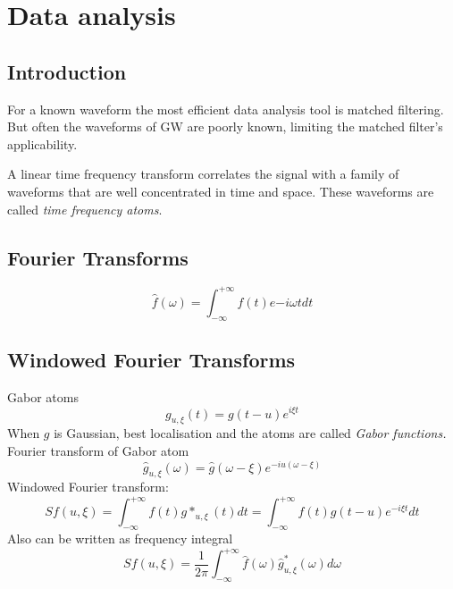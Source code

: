 %

\chapter{Data analysis}           
\section{Introduction}     
For a known waveform the most efficient data analysis tool is matched filtering. But often the waveforms of GW are poorly known, limiting the matched filter's applicability. 

A linear time frequency transform correlates the signal with a family of waveforms that are well concentrated in time and space. These waveforms are called \textit{time frequency atoms}.

\section{Fourier Transforms}
\[\hat{f}(\omega)=\int^{+\infty}_{-\infty}f(t)e{-i\omega t}dt \]

\section{Windowed Fourier Transforms}
Gabor atoms 
\[ g_{u,\xi} (t)=g(t-u)e^{i\xi t} \]
When $g$ is Gaussian, best localisation and the atoms are called \textit{Gabor functions.} Fourier transform of Gabor atom
\[ \hat{g}_{u,\xi} (\omega) =\hat{g}(\omega-\xi) e^{-iu(\omega-\xi)} \]
Windowed Fourier transform:
\[ Sf(u,\xi)=\int^{+\infty}_{-\infty}f(t)g*_{u,\xi}(t)dt=\int^{+\infty}_{-\infty}f(t)g(t-u)e^{-i\xi t}dt \]
Also can be written as frequency integral
\[ Sf(u,\xi)=\frac{1}{2\pi}\int^{+\infty}_{-\infty}\hat{f}(\omega)\hat{g}^{*}_{u,\xi}(\omega)d\omega \]

